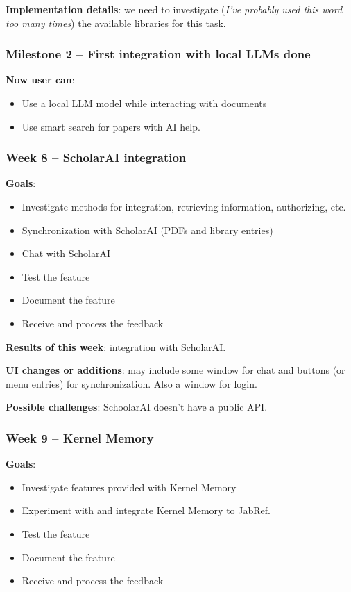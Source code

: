 \documentclass{article}
\begin{document}
	\textbf{Implementation details}: we need to investigate (\textit{I've probably used this word too many times}) the available libraries for this task.
	
	\subsubsection{Milestone 2 -- First integration with local LLMs done}
	\textbf{Now user can}:
	\begin{itemize}
		\item Use a local LLM model while interacting with documents
		\item Use smart search for papers with AI help.
	\end{itemize}
	
	\subsubsection{Week 8 -- ScholarAI integration}
	\textbf{Goals}:
	\begin{itemize}
		\item Investigate methods for integration, retrieving information, authorizing, etc.
		\item Synchronization with ScholarAI (PDFs and library entries)
		\item Chat with ScholarAI
		\item Test the feature
		\item Document the feature
		\item Receive and process the feedback
	\end{itemize}
	
	\textbf{Results of this week}: integration with ScholarAI.
	
	\textbf{UI changes or additions}: may include some window for chat and buttons (or menu entries) for synchronization. Also a window for login.
	
	\textbf{Possible challenges}: SchoolarAI doesn't have a public API.
	
	\subsubsection{Week 9 -- Kernel Memory}
	\textbf{Goals}:
	\begin{itemize}
		\item Investigate features provided with Kernel Memory
		\item Experiment with and integrate Kernel Memory to JabRef.
		\item Test the feature
		\item Document the feature
		\item Receive and process the feedback
	\end{itemize}
	
\end{document}
